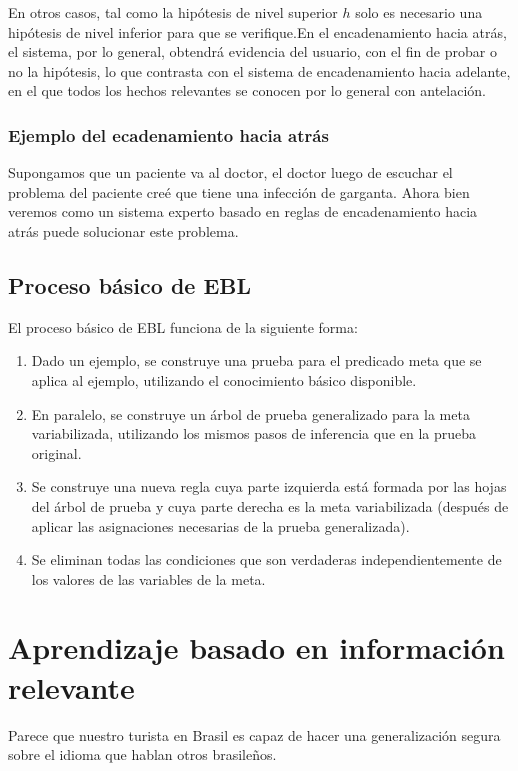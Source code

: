 \documentclass[12 pt, a4paper]{article}
\begin{document}
			En otros casos, tal como la hipótesis de nivel superior $h$ solo es necesario una hipótesis de nivel inferior para que se verifique.En el encadenamiento hacia atrás, el sistema, por lo general, obtendrá evidencia del usuario, con el fin de probar o no la hipótesis, lo que contrasta con el sistema de encadenamiento hacia adelante, en el que todos los hechos relevantes se conocen por lo general con antelación.
			\subsubsection{Ejemplo del ecadenamiento hacia atrás}
			Supongamos que un paciente va al doctor, el doctor luego de escuchar el problema del paciente creé que tiene una infección de garganta. Ahora bien veremos como un sistema experto basado en reglas de encadenamiento hacia atrás puede solucionar este problema.
			
			\subsection{Proceso básico de EBL}
			El proceso básico de EBL funciona de la siguiente forma:
				\begin{enumerate}
						\item Dado un ejemplo, se construye una prueba para el predicado meta que se aplica al ejemplo, utilizando el conocimiento básico disponible.\\
						  \item En paralelo, se construye un árbol de prueba generalizado para la meta variabilizada, utilizando los mismos pasos de inferencia que en la prueba original.\\
						  \item Se construye una nueva regla cuya parte izquierda está formada por las hojas del árbol de prueba y cuya parte derecha es la meta variabilizada (después de aplicar las asignaciones necesarias de la prueba generalizada).\\
						  \item Se eliminan todas las condiciones que son verdaderas independientemente de los valores de las variables de la meta.\\
				\end{enumerate}
	 \section{Aprendizaje basado en información relevante}
		Parece que nuestro turista en Brasil es capaz de hacer una generalización segura sobre el idioma que hablan otros brasileños. 
\end{document}
